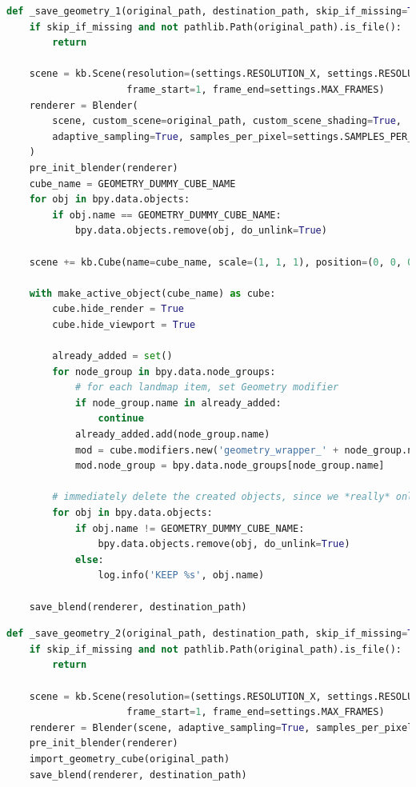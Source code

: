\begin{lstlisting}[language=python,caption={Geometry Nodes - Export - First Step},label={fig:appendix-export-first-step-geometry-nodes}]
def _save_geometry_1(original_path, destination_path, skip_if_missing=True):
    if skip_if_missing and not pathlib.Path(original_path).is_file():
        return

    scene = kb.Scene(resolution=(settings.RESOLUTION_X, settings.RESOLUTION_Y),
                     frame_start=1, frame_end=settings.MAX_FRAMES)
    renderer = Blender(
        scene, custom_scene=original_path, custom_scene_shading=True,
        adaptive_sampling=True, samples_per_pixel=settings.SAMPLES_PER_PIXEL,
    )
    pre_init_blender(renderer)
    cube_name = GEOMETRY_DUMMY_CUBE_NAME
    for obj in bpy.data.objects:
        if obj.name == GEOMETRY_DUMMY_CUBE_NAME:
            bpy.data.objects.remove(obj, do_unlink=True)

    scene += kb.Cube(name=cube_name, scale=(1, 1, 1), position=(0, 0, 0))

    with make_active_object(cube_name) as cube:
        cube.hide_render = True
        cube.hide_viewport = True

        already_added = set()
        for node_group in bpy.data.node_groups:
            # for each landmap item, set Geometry modifier
            if node_group.name in already_added:
                continue
            already_added.add(node_group.name)
            mod = cube.modifiers.new('geometry_wrapper_' + node_group.name, 'NODES')
            mod.node_group = bpy.data.node_groups[node_group.name]

        # immediately delete the created objects, since we *really* only want the cube
        for obj in bpy.data.objects:
            if obj.name != GEOMETRY_DUMMY_CUBE_NAME:
                bpy.data.objects.remove(obj, do_unlink=True)
            else:
                log.info('KEEP %s', obj.name)

    save_blend(renderer, destination_path)
\end{lstlisting}



\begin{lstlisting}[language=python,caption={Geometry Nodes - Export - Second Step},label={fig:appendix-export-second-step-geometry-nodes}]
def _save_geometry_2(original_path, destination_path, skip_if_missing=True):
    if skip_if_missing and not pathlib.Path(original_path).is_file():
        return

    scene = kb.Scene(resolution=(settings.RESOLUTION_X, settings.RESOLUTION_Y),
                     frame_start=1, frame_end=settings.MAX_FRAMES)
    renderer = Blender(scene, adaptive_sampling=True, samples_per_pixel=settings.SAMPLES_PER_PIXEL)
    pre_init_blender(renderer)
    import_geometry_cube(original_path)
    save_blend(renderer, destination_path)
\end{lstlisting}


